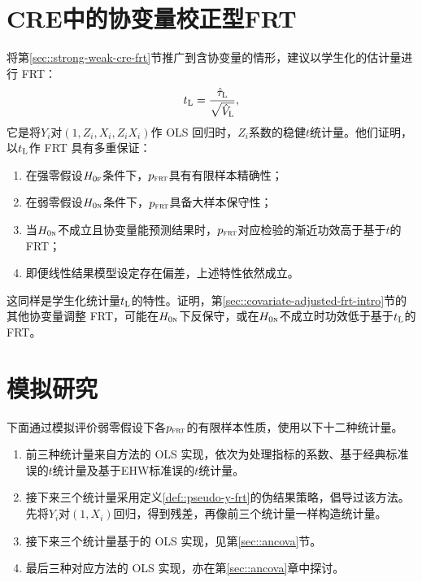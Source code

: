  
 
\section{CRE中的协变量校正型FRT}
 \label{sec::xfrt-cre}
 
将第\ref{sec::strong-weak-cre-frt}节推广到含协变量的情形，\citet{zhao2020caFRT}建议以学生化的\citet{lin2013}估计量进行 FRT：
$$
t_\textsc{L}   =  \frac{  \hat{\tau}_\textsc{L} }{  \sqrt{\hat{V}_\textsc{L}}  },
$$
它是将$Y_i$对$( 1, Z_i, X_i, Z_i X_i) $作 OLS 回归时，$Z_i$系数的稳健$t$统计量。他们证明，以$t_\textsc{L} $作 FRT 具有多重保证：
 \begin{enumerate}
\item
 在强零假设$H_{0\textsc{f}}$条件下，$p_{\textsc{frt}}$具有有限样本精确性；
\item
 在弱零假设$H_{0\textsc{n}}$条件下，$p_{\textsc{frt}}$具备大样本保守性；
\item
 当$H_{0\textsc{n}}$不成立且协变量能预测结果时，$p_{\textsc{frt}}$对应检验的渐近功效高于基于$t$的 FRT；
\item
即便线性结果模型设定存在偏差，上述特性依然成立。 
\end{enumerate}
这同样是学生化统计量$t_\textsc{L} $的特性。\citet{zhao2020caFRT}证明，第\ref{sec::covariate-adjusted-frt-intro}节的其他协变量调整 FRT，可能在$H_{0\textsc{n}}$下反保守，或在$H_{0\textsc{n}}$不成立时功效低于基于$t_\textsc{L} $的 FRT。  




\section{模拟研究}
\label{sec::simulation-xfrt-typeoneerror}




下面通过模拟评价弱零假设下各$p_{\textsc{frt}}$的有限样本性质，使用以下十二种统计量。
\begin{enumerate}
\item
前三种统计量来自\citet{Neyman:1923}方法的 OLS 实现，依次为处理指标的系数、基于经典标准误的$t$统计量及基于EHW标准误的$t$统计量。

\item
接下来三个统计量采用定义\ref{def::pseudo-y-frt}的伪结果策略，\citet{rosenbaum2002covariance}倡导过该方法。先将$Y_i$对$(1,X_i)$回归，得到残差，再像前三个统计量一样构造统计量。

\item
接下来三个统计量基于\citet{fisher1925statistical}的 OLS 实现，见第\ref{sec::ancova}节。

\item
最后三种对应\citet{lin2013}方法的 OLS 实现，亦在第\ref{sec::ancova}章中探讨。
\end{enumerate}

